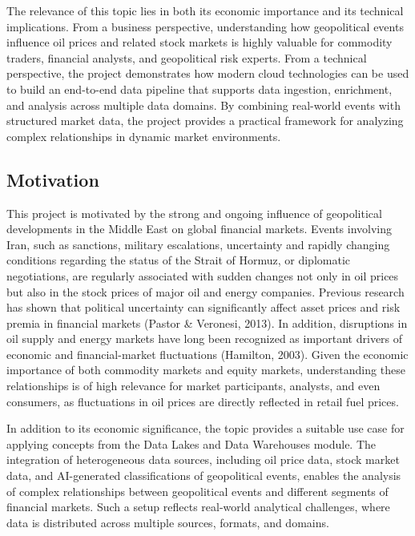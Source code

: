 \documentclass[11pt,a4paper]{article}
\begin{document}
The relevance of this topic lies in both its economic importance and its technical implications. From a business perspective, understanding how geopolitical events influence oil prices and related stock markets is highly valuable for commodity traders, financial analysts, and geopolitical risk experts. From a technical perspective, the project demonstrates how modern cloud technologies can be used to build an end-to-end data pipeline that supports data ingestion, enrichment, and analysis across multiple data domains. By combining real-world events with structured market data, the project provides a practical framework for analyzing complex relationships in dynamic market environments.

\subsection{Motivation}
\label{sec:motivation}

This project is motivated by the strong and ongoing influence of geopolitical developments in the Middle East on global financial markets. Events involving Iran, such as sanctions, military escalations, uncertainty and rapidly changing conditions regarding the status of the Strait of Hormuz, or diplomatic negotiations, are regularly associated with sudden changes not only in oil prices but also in the stock prices of major oil and energy companies. Previous research has shown that political uncertainty can significantly affect asset prices and risk premia in financial markets (Pastor \& Veronesi, 2013). In addition, disruptions in oil supply and energy markets have long been recognized as important drivers of economic and financial-market fluctuations (Hamilton, 2003). Given the economic importance of both commodity markets and equity markets, understanding these relationships is of high relevance for market participants, analysts, and even consumers, as fluctuations in oil prices are directly reflected in retail fuel prices.

In addition to its economic significance, the topic provides a suitable use case for applying concepts from the Data Lakes and Data Warehouses module. The integration of heterogeneous data sources, including oil price data, stock market data, and AI-generated classifications of geopolitical events, enables the analysis of complex relationships between geopolitical events and different segments of financial markets. Such a setup reflects real-world analytical challenges, where data is distributed across multiple sources, formats, and domains.
\end{document}
